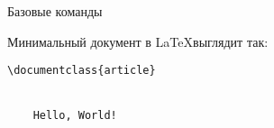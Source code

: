 \begin{frame}[fragile]{Базовые команды}

Минимальный документ в \LaTeX \enspace выглядит так:
\begin{lstlisting}
\documentclass{article}


    Hello, World!

\end{lstlisting}

\end{frame}
